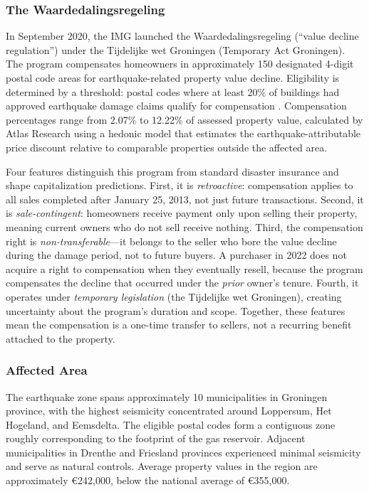 \documentclass[12pt]{article}
\begin{document}
\subsubsection*{The Waardedalingsregeling} In September 2020, the IMG launched the Waardedalingsregeling (``value decline regulation'') under the Tijdelijke wet Groningen (Temporary Act Groningen). The program compensates homeowners in approximately 150 designated 4-digit postal code areas for earthquake-related property value decline. Eligibility is determined by a threshold: postal codes where at least 20\% of buildings had approved earthquake damage claims qualify for compensation \citep{atlas2020}. Compensation percentages range from 2.07\% to 12.22\% of assessed property value, calculated by Atlas Research using a hedonic model that estimates the earthquake-attributable price discount relative to comparable properties outside the affected area.

Four features distinguish this program from standard disaster insurance and shape capitalization predictions. First, it is \emph{retroactive}: compensation applies to all sales completed after January 25, 2013, not just future transactions. Second, it is \emph{sale-contingent}: homeowners receive payment only upon selling their property, meaning current owners who do not sell receive nothing. Third, the compensation right is \emph{non-transferable}---it belongs to the seller who bore the value decline during the damage period, not to future buyers. A purchaser in 2022 does not acquire a right to compensation when they eventually resell, because the program compensates the decline that occurred under the \emph{prior} owner's tenure. Fourth, it operates under \emph{temporary legislation} (the Tijdelijke wet Groningen), creating uncertainty about the program's duration and scope. Together, these features mean the compensation is a one-time transfer to sellers, not a recurring benefit attached to the property.

\subsubsection*{Affected Area} The earthquake zone spans approximately 10 municipalities in Groningen province, with the highest seismicity concentrated around Loppersum, Het Hogeland, and Eemsdelta. The eligible postal codes form a contiguous zone roughly corresponding to the footprint of the gas reservoir. Adjacent municipalities in Drenthe and Friesland provinces experienced minimal seismicity and serve as natural controls. Average property values in the region are approximately \euro 242,000, below the national average of \euro 355,000.
\end{document}
